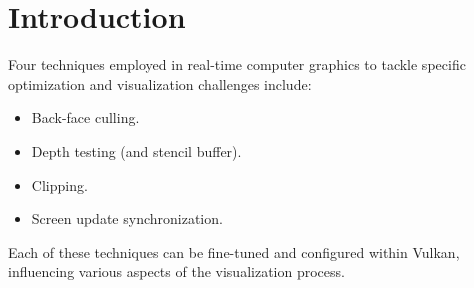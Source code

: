 \section{Introduction}

Four techniques employed in real-time computer graphics to tackle specific optimization and visualization challenges include:
\begin{itemize}
    \item Back-face culling.
    \item Depth testing (and stencil buffer).
    \item Clipping.
    \item Screen update synchronization.
\end{itemize}
Each of these techniques can be fine-tuned and configured within Vulkan, influencing various aspects of the visualization process.